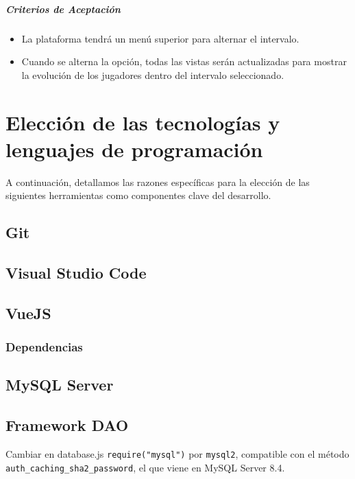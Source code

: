 \subparagraph{Criterios de Aceptación}
\begin{itemize}
    \item La plataforma tendrá un menú superior para alternar el intervalo.
    \item Cuando se alterna la opción, todas las vistas serán actualizadas para mostrar la evolución de los jugadores dentro del intervalo seleccionado.
\end{itemize}


\section{Elección de las tecnologías y lenguajes de programación}
A continuación, detallamos las razones específicas para la elección de las siguientes herramientas como componentes clave del desarrollo.

\subsection{Git}

\subsection{Visual Studio Code}


\subsection{VueJS}

\subsubsection{Dependencias}


\subsection{MySQL Server}

\subsection{Framework DAO}
Cambiar en database.js \lstinline|require("mysql")| por \lstinline|mysql2|, compatible con el método \lstinline|auth_caching_sha2_password|, el que viene en MySQL Server 8.4.

